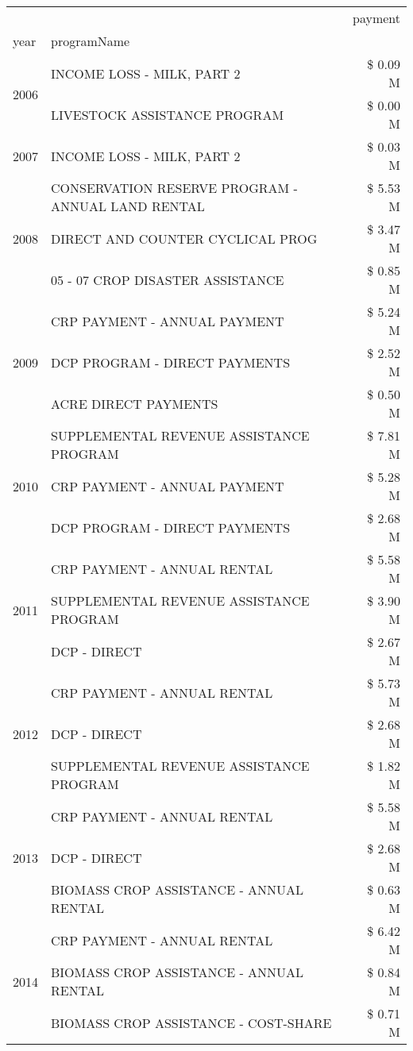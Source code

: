 \begin{tabular}{llr}
\toprule
 &  & payment \\
year & programName &  \\
\midrule
\multirow[t]{2}{*}{2006} & INCOME LOSS - MILK, PART 2 & \$ 0.09 M \\
 & LIVESTOCK ASSISTANCE PROGRAM & \$ 0.00 M \\
\cline{1-3}
2007 & INCOME LOSS - MILK, PART 2 & \$ 0.03 M \\
\cline{1-3}
\multirow[t]{3}{*}{2008} & CONSERVATION RESERVE PROGRAM - ANNUAL LAND RENTAL & \$ 5.53 M \\
 & DIRECT AND COUNTER CYCLICAL PROG & \$ 3.47 M \\
 & 05 - 07 CROP DISASTER ASSISTANCE & \$ 0.85 M \\
\cline{1-3}
\multirow[t]{3}{*}{2009} & CRP PAYMENT - ANNUAL PAYMENT & \$ 5.24 M \\
 & DCP PROGRAM - DIRECT PAYMENTS & \$ 2.52 M \\
 & ACRE DIRECT PAYMENTS & \$ 0.50 M \\
\cline{1-3}
\multirow[t]{3}{*}{2010} & SUPPLEMENTAL REVENUE ASSISTANCE PROGRAM & \$ 7.81 M \\
 & CRP PAYMENT - ANNUAL PAYMENT & \$ 5.28 M \\
 & DCP PROGRAM - DIRECT PAYMENTS & \$ 2.68 M \\
\cline{1-3}
\multirow[t]{3}{*}{2011} & CRP PAYMENT - ANNUAL RENTAL & \$ 5.58 M \\
 & SUPPLEMENTAL REVENUE ASSISTANCE PROGRAM & \$ 3.90 M \\
 & DCP - DIRECT & \$ 2.67 M \\
\cline{1-3}
\multirow[t]{3}{*}{2012} & CRP PAYMENT - ANNUAL RENTAL & \$ 5.73 M \\
 & DCP - DIRECT & \$ 2.68 M \\
 & SUPPLEMENTAL REVENUE ASSISTANCE PROGRAM & \$ 1.82 M \\
\cline{1-3}
\multirow[t]{3}{*}{2013} & CRP PAYMENT - ANNUAL RENTAL & \$ 5.58 M \\
 & DCP - DIRECT & \$ 2.68 M \\
 & BIOMASS CROP ASSISTANCE - ANNUAL RENTAL & \$ 0.63 M \\
\cline{1-3}
\multirow[t]{3}{*}{2014} & CRP PAYMENT - ANNUAL RENTAL & \$ 6.42 M \\
 & BIOMASS CROP ASSISTANCE - ANNUAL RENTAL & \$ 0.84 M \\
 & BIOMASS CROP ASSISTANCE - COST-SHARE & \$ 0.71 M \\

\end{tabular}
